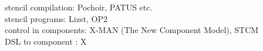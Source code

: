 stencil compilation: Pochoir, PATUS etc.\\
stencil programs: Lizst, OP2\\
control in components: X-MAN (The New Component Model), STCM\\
DSL to component : X